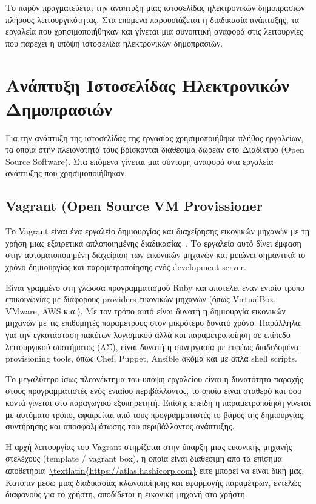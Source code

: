 \documentclass[12pt]{report}
\begin{document}
Το παρόν πραγματεύεται την ανάπτυξη μιας ιστοσελίδας ηλεκτρονικών δημοπρασιών πλήρους λειτουργικότητας. Στα επόμενα παρουσιάζεται η διαδικασία ανάπτυξης, τα εργαλεία που χρησιμοποιήθηκαν και γίνεται μια συνοπτική αναφορά στις λειτουργίες που παρέχει η υπόψη ιστοσελίδα ηλεκτρονικών δημοπρασιών.

\chapter{Ανάπτυξη Ιστοσελίδας Ηλεκτρονικών Δημοπρασιών}\label{ch2}
Για την ανάπτυξη της ιστοσελίδας της εργασίας χρησιμοποιήθηκε πλήθος εργαλείων, τα οποία στην πλειονότητά τους βρίσκονται διαθέσιμα δωρεάν στο Διαδίκτυο (\textlatin{Open Source Software}). Στα επόμενα γίνεται μια σύντομη αναφορά στα εργαλεία ανάπτυξης που χρησιμοποιήθηκαν.

\section{\textlatin{\textlatin{Vagrant (Open Source VM Provissioner}}}
Το \textlatin{Vagrant} είναι ένα εργαλείο δημιουργίας και διαχείρησης εικονικών μηχανών με τη χρήση μιας εξαιρετικά απλοποιημένης διαδικασίας~\cite{vagrant_by_hashicorp}. Το εργαλείο αυτό δίνει έμφαση στην αυτοματοποιημένη διαχείριση των εικονικών μηχανών και μειώνει σημαντικά το χρόνο δημιουργίας και παραμετροποίησης ενός \textlatin{development server}.

Είναι γραμμένο στη γλώσσα προγραμματισμού \textlatin{Ruby} και αποτελεί έναν ενιαίο τρόπο επικοινωνίας με δίάφορους \textlatin{providers} εικονικών μηχανών (όπως \textlatin{VirtualBox, VMware, AWS} κ.α.). Με τον τρόπο αυτό είναι δυνατή η δημιουργία εικονικών μηχανών με τις επιθυμητές παραμέτρους στον μικρότερο δυνατό χρόνο. Παράλληλα, για την εγκατάσταση πακέτων λογισμικού αλλά και παραμετροποίηση σε επίπεδο λειτουργικού συστήματος (ΛΣ), είναι δυνατή η συνεργασία με ευρέως διαδεδομένα \textlatin{provisioning tools}, όπως \textlatin{Chef, Puppet, Ansible} ακόμα και με απλά \textlatin{shell scripts}.

Το μεγαλύτερο ίσως πλεονέκτημα του υπόψη εργαλείου είναι η δυνατότητα παροχής στους προγραμματιστές ενός ενιαίου περιβάλλοντος, το οποίο είναι σταθερό και όσο κοντά γίνεται στο παραγωγικό εξυπηρετητή. Επίσης επειδή η παραμετροποίηση γίνεται με αυτόματο τρόπο, αφαιρείται από τους προγραμματιστές το βάρος της δημιουργίας, συντήρησης και αποσφαλμάτωσης του περιβάλλοντος ανάπτυξης.

Η αρχή λειτουργίας του \textlatin{Vagrant} στηρίζεται στην ύπαρξη μιας εικονικής μηχανής στελέχους (\textlatin{template / vagrant box}), η οποία είναι διαθέσιμη από τα επίσημα αποθετήρια~\url{\textlatin{https://atlas.hashicorp.com}} είτε μπορεί να είναι δική μας. Κατόπιν μέσω μιας διαδικασίας κλωνοποίησης και εφαρμογής παραμέτρων, εντελώς διαφανούς για το χρήστη, αποδίδεται η εικονική μηχανή στο χρήστη.
\end{document}
